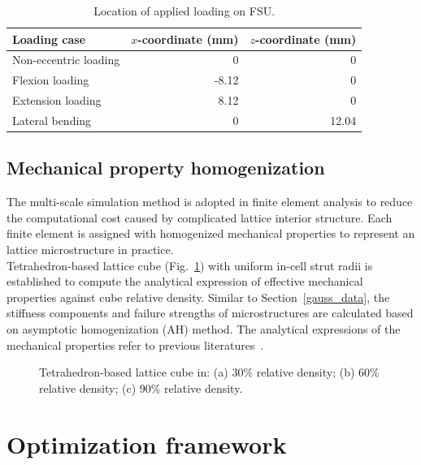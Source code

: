 \documentclass[12pt]{extbook}
\begin{document}
\begin{table}[htbp]
\centering
\caption{Location of applied loading on FSU.}
\begin{tabular}{lrr}
\hline\hline
Loading case & $x$-coordinate (mm) & $z$-coordinate (mm)\\
\hline
Non-eccentric loading & 0 & 0\\
Flexion loading& -8.12 & 0\\
Extension loading & 8.12 & 0\\
Lateral bending & 0 & 12.04\\
\hline\hline
\end{tabular}
\label{loading_position}
\end{table}


\subsection{Mechanical property homogenization}

The multi-scale simulation method is adopted in finite element analysis to reduce the computational cost caused by complicated lattice interior structure. Each finite element is assigned with homogenized mechanical properties to represent an lattice microstructure in practice.\\

Tetrahedron-based lattice cube (Fig.~\ref{tet_cube}) with uniform in-cell strut radii is established to compute the analytical expression of effective mechanical properties against cube relative density. Similar to Section~\ref{gauss_data}, the stiffness components and failure strengths of microstructures are calculated based on asymptotic homogenization (AH) method. The analytical expressions of the mechanical properties refer to previous literatures~\cite{wang2018hip}.

\begin{figure}[htbp]
\centering
{}
\caption{Tetrahedron-based lattice cube in: (a) 30\% relative density; (b) 60\% relative density; (c) 90\% relative density.} 
\label{tet_cube}
\end{figure}


\section{Optimization framework}
\end{document}
